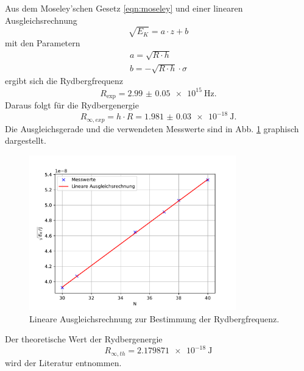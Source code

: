 \FloatBarrier

Aus dem Moseley'schen Gesetz \eqref{eqn:moseley} und einer linearen Ausgleichsrechnung
\begin{equation*}
    \sqrt{E_K} = a \cdot z + b
\end{equation*}
mit den Parametern
\begin{align*}
    a = \sqrt{R \cdot h} \\
    b = -\sqrt{ R\cdot h} \cdot \sigma
\end{align*}
ergibt sich die Rydbergfrequenz
\begin{equation*}
    R_\text{exp} = \SI{2.99(5)e15}{\hertz} .
\end{equation*}
Daraus folgt für die Rydbergenergie
\begin{equation}
    R_{\infty ,exp} = h \cdot R = \SI{1.981(30)e-18}{\joule} .
\end{equation}
Die Ausgleichsgerade und die verwendeten Messwerte sind in Abb. \ref{fig:ausgleich} graphisch dargestellt.
\begin{figure}
    \centering
    \includegraphics[width=0.8\textwidth]{content/data/ausgleich.pdf}
    \caption{Lineare Ausgleichsrechnung zur Bestimmung der Rydbergfrequenz. \cite{numpy} \cite{matplotlib} \cite{scipy}} 
    \label{fig:ausgleich}
\end{figure}
\FloatBarrier
Der theoretische Wert der Rydbergenergie \cite{konst}
\begin{equation*}
    R_{\infty ,th} = \SI{2.179871e-18}{\joule}
\end{equation*}
wird der Literatur entnommen.